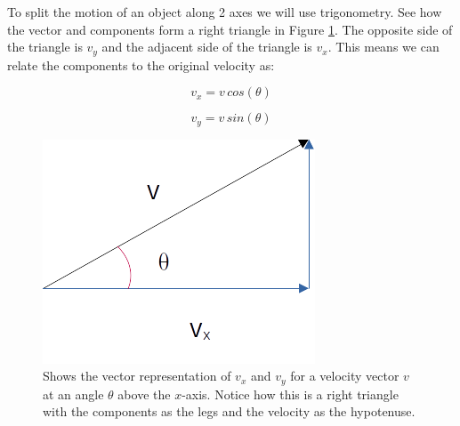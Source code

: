\documentclass[12pt]{book}
\begin{document}






To split the motion of an object along 2 axes we will use trigonometry. See how the vector and components form a right triangle in Figure \ref{velangle}. The opposite side of the triangle is $v_y$ and the adjacent side of the triangle is $v_x$. This means we can relate the components to the original velocity as:

\begin{equation}
v_x = v \, cos(\theta)
\end{equation}

\begin{equation}
v_y = v \, sin(\theta)
\end{equation}

\begin{figure}[t]
\centering
\includegraphics[scale=0.4]{Velocity_Angle.png}
\caption{Shows the vector representation of $v_x$ and $v_y$ for a velocity vector $v$ at an angle $\theta$ above the $x$-axis. Notice how this is a right triangle with the components as the legs and the velocity as the hypotenuse.}
\label{velangle}
\end{figure}
\end{document}
